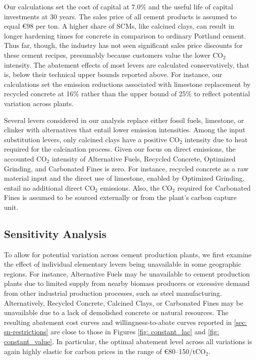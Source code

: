 \documentclass[12pt, a4paper]{article} %
\begin{document}
Our calculations set the cost of capital at 7.0\% and the useful life of capital investments at 30 years. The sales price of all cement products is assumed to equal \euro 98 per ton. A higher share of SCMs, like calcined clays, can result in longer hardening times for concrete in comparison to ordinary Portland cement. Thus far, though, the industry has not seen significant sales price discounts for these cement recipes, presumably because customers  value the lower CO$_2$ intensity. The abatement effects of most levers are calculated conservatively, that is, below their technical upper bounds reported above. For instance, our calculations set the emission reductions associated with limestone replacement by recycled concrete at 16\% rather than the upper bound of 25\% to reflect potential variation across plants.

Several levers considered in our analysis replace either fossil fuels, limestone, or clinker with alternatives that entail lower emission intensities. Among the input substitution levers, only calcined clays have a positive CO$_2$ intensity due to heat required for the calcination process. Given our focus on direct emissions, the accounted CO$_2$ intensity of Alternative Fuels, Recycled Concrete, Optimized Grinding, and Carbonated Fines is zero. For instance, recycled concrete as a raw material input and the direct use of limestone, enabled by Optimized Grinding, entail no additional direct CO$_2$ emissions. Also, the CO$_2$ required for Carbonated Fines is assumed to be sourced externally or from the plant's carbon capture unit.


\subsection*{Sensitivity Analysis}

To allow for potential variation across cement production plants, we first examine the effect of individual elementary levers being unavailable in some geographic regions. For instance, Alternative Fuels may be unavailable to cement production plants due to limited supply from nearby biomass producers or excessive demand from other industrial production processes, such as steel manufacturing. Alternatively, Recycled Concrete, Calcined Clays, or Carbonated Fines may be unavailable due to a lack of demolished concrete or natural resources. The resulting abatement cost curves and willingness-to-abate curves reported in \ref{sec: sn-restrictions} are close to those in Figures \ref{fig: constant_lac} and \ref{fig: constant_value}. In particular, the optimal abatement level across all variations is again highly elastic for carbon prices in the range of \euro 80--150/tCO$_2$.
\end{document}

